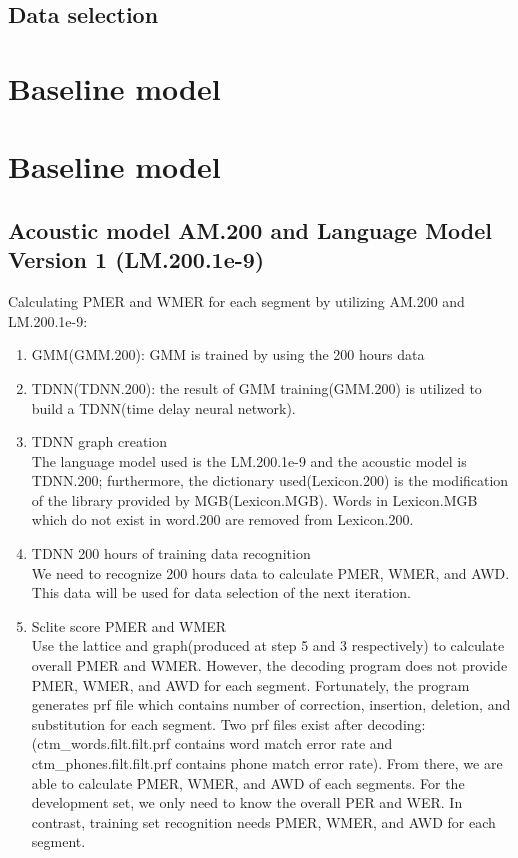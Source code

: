 \subsection{Data selection}

\section{Baseline model}



\section{Baseline model}

\subsection{Acoustic model AM.200 and Language Model Version 1 (LM.200.1e-9)}
\label{amv0s1}


Calculating PMER and WMER for each segment by utilizing AM.200 and LM.200.1e-9:
\begin{enumerate}
\item GMM(GMM.200): GMM is trained by using the 200 hours data
\item TDNN(TDNN.200): the result of GMM training(GMM.200) is utilized to build a TDNN(time delay neural network). 
\item TDNN graph creation \\
The language model used is the LM.200.1e-9 and  the acoustic model is  TDNN.200; furthermore, the dictionary used(Lexicon.200) is the modification of the library provided by MGB(Lexicon.MGB). Words in Lexicon.MGB which do not exist in word.200 are removed from Lexicon.200.
\item TDNN 200 hours of training data recognition \\
We need to recognize 200 hours data to calculate PMER, WMER, and AWD. This data will be used for data selection of the next iteration.
\item Sclite score PMER and WMER \\
Use the lattice and graph(produced at step 5 and 3 respectively) to calculate overall PMER and WMER. However, the decoding program does not provide PMER, WMER, and AWD for each segment. Fortunately, the program generates prf file which contains number of correction, insertion, deletion, and substitution for each segment. Two prf files exist after decoding:(ctm\_words.filt.filt.prf contains word match error rate and ctm\_phones.filt.filt.prf contains phone match error rate). From there, we are able to calculate  PMER, WMER, and AWD of each segments.  For the development set, we only need to know the overall PER and WER. In contrast, training set recognition needs PMER, WMER, and AWD for each segment. 

\end{enumerate}


